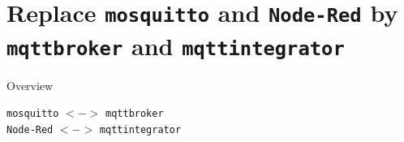 ﻿\part{Replace \texttt{mosquitto} and \texttt{Node-Red} by \texttt{mqttbroker} and \texttt{mqttintegrator}}

\begin{frame}[fragile]{Overview}
  \begin{center}
    \Huge{\texttt{\textcolor{fh-ooe-red}{mosquitto}} $<->$ \texttt{\textcolor{fh-ooe-red}{mqttbroker}}}\\
    \vspace{1cm}
    \Huge{\texttt{\textcolor{fh-ooe-red}{Node-Red}} $<->$ \texttt{\textcolor{fh-ooe-red}{mqttintegrator}}}\\
  \end{center}
\end{frame}

